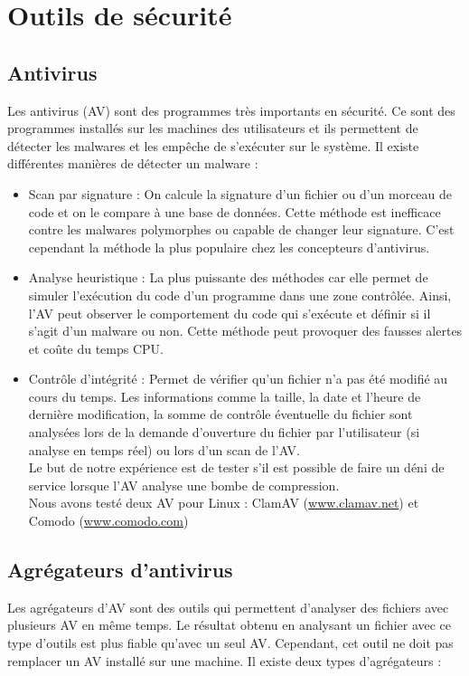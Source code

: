 \documentclass[smallextended]{svjour3}       %
\begin{document}
\section{Outils de sécurité}
\label{2.Outils}

\subsection{Antivirus}
\label{2.1antivirus}
Les antivirus (AV) sont des programmes très importants en sécurité. Ce sont des programmes installés sur les machines des utilisateurs et ils permettent de détecter les malwares et les empêche de s’exécuter sur le système. Il existe différentes manières de détecter un malware : 
\begin{itemize}
\item Scan par signature : On calcule la signature d'un fichier ou d'un morceau de code et on le compare à une base de données. Cette méthode est inefficace contre les malwares polymorphes ou capable de changer leur signature. C'est cependant la méthode la plus populaire chez les concepteurs d'antivirus.
\item Analyse heuristique : La plus puissante des méthodes car elle permet de simuler l’exécution du code d'un programme dans une zone contrôlée. Ainsi, l'AV peut observer le comportement du code qui s’exécute et définir si il s'agit d'un malware ou non. Cette méthode peut provoquer des fausses alertes et coûte du temps CPU.
\item Contrôle d'intégrité : Permet de vérifier qu'un fichier n'a pas été modifié au cours du temps. Les informations comme la taille, la date et l'heure de dernière modification, la somme de contrôle éventuelle du fichier sont analysées lors de la demande d'ouverture du fichier par l'utilisateur (si analyse en temps réel) ou lors d'un scan de l'AV.\\
Le but de notre expérience est de tester s'il est possible de faire un déni de service lorsque l'AV analyse une bombe de compression.\\
Nous avons testé deux AV pour Linux : ClamAV (\url{www.clamav.net}) et Comodo (\url{www.comodo.com})\\
\end{itemize}

\subsection{Agrégateurs d'antivirus}
\label{2.2agrégateurs}
Les agrégateurs d'AV sont des outils qui permettent d'analyser des fichiers avec plusieurs AV en même temps. Le résultat obtenu en analysant un fichier avec ce type d'outils est plus fiable qu'avec un seul AV. Cependant, cet outil ne doit pas remplacer un AV installé sur une machine. Il existe deux types d’agrégateurs :  
\end{document}
